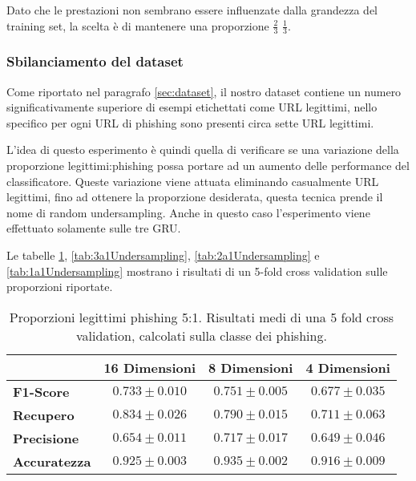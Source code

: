 \documentclass[../../main.tex]{subfiles}
\begin{document}
    Dato che le prestazioni non sembrano essere influenzate dalla grandezza del training set, la scelta è di mantenere una proporzione $\frac{2}{3}$ $\frac{1}{3}$.

    \subsubsection{Sbilanciamento del dataset}
    Come riportato nel paragrafo \ref{sec:dataset}, il nostro dataset contiene un numero significativamente superiore di esempi etichettati come URL legittimi, nello specifico per ogni URL di phishing sono presenti circa sette URL legittimi.

    L'idea di questo esperimento è quindi quella di verificare se una variazione della proporzione legittimi:phishing possa portare ad un aumento delle performance del classificatore. Queste variazione viene attuata eliminando  casualmente URL legittimi, fino ad ottenere la proporzione desiderata, questa tecnica prende il nome di random undersampling. Anche in questo caso l'esperimento viene effettuato solamente sulle tre GRU.

    Le tabelle \ref{tab:5a1Undersampling}, \ref{tab:3a1Undersampling}, \ref{tab:2a1Undersampling} e \ref{tab:1a1Undersampling} mostrano i risultati di un 5-fold cross validation sulle proporzioni riportate.


    \begin{table}[H]
        \centering
        \begin{tabular}{lccc}
            \toprule
            {} &                      \textbf{16 Dimensioni} & \textbf{8 Dimensioni} & \textbf{4 Dimensioni} \\
            \midrule
            \textbf{F1-Score }      &      $0.733 \pm 0.010$ & $0.751 \pm 0.005$ & $0.677 \pm 0.035$\\
            \textbf{Recupero   }    &      $0.834 \pm 0.026$ & $0.790 \pm 0.015$ & $0.711 \pm 0.063$\\
            \textbf{Precisione}     &      $0.654 \pm 0.011$ & $0.717 \pm 0.017$ & $0.649 \pm 0.046$\\
            \textbf{Accuratezza }   &      $0.925 \pm 0.003$ & $0.935 \pm 0.002$ & $0.916 \pm 0.009$\\
            \bottomrule
        \end{tabular}
        \caption{Proporzioni legittimi phishing 5:1. Risultati medi di una 5 fold cross validation, calcolati sulla classe dei phishing.}
        \label{tab:5a1Undersampling}
    \end{table}
\end{document}
